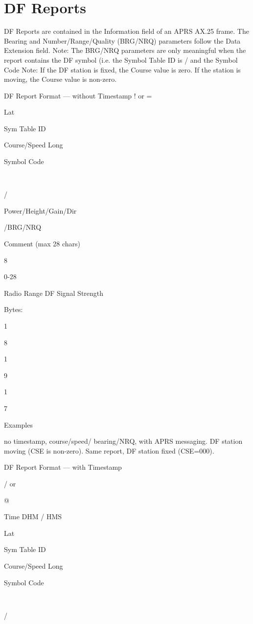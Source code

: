 \section{DF Reports}

DF Reports are contained in the Information field of an APRS AX.25 frame.
The Bearing and Number/Range/Quality (BRG/NRQ) parameters follow the
Data Extension field.
Note: The BRG/NRQ parameters are only meaningful when the report
contains the DF symbol (i.e. the Symbol Table ID is / and the Symbol Code
Note: If the DF station is fixed, the Course value is zero. If the station is
moving, the Course value is non-zero.

DF Report Format — without Timestamp
! or
=

Lat

Sym
Table
ID

Course/Speed
Long

Symbol
Code

\

/

Power/Height/Gain/Dir

/BRG/NRQ

Comment
(max 28
chars)

8

0-28

Radio Range
DF Signal Strength

Bytes:

1

8

1

9

1

7

Examples




no timestamp, course/speed/
bearing/NRQ, with APRS messaging.
DF station moving (CSE is non-zero).
Same report, DF station fixed
(CSE=000).


DF Report Format — with Timestamp

/ or

@

Time
DHM /
HMS

Lat

Sym
Table
ID

Course/Speed
Long

Symbol
Code

\

/

